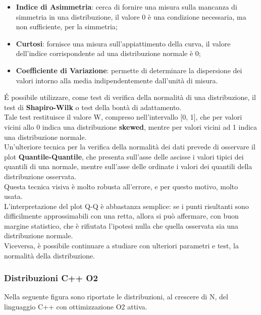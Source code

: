 \begin{itemize}
  \item \textbf{Indice di Asimmetria}: cerca di fornire una misura sulla mancanza
  di simmetria in una distribuzione, il valore 0 è una condizione necessaria, ma
  non sufficiente, per la simmetria;
  \item \textbf{Curtosi}: fornisce una misura sull'appiattimento della curva,
  il valore dell'indice corrispondente ad una distribuzione normale è 0;
  \item \textbf{Coefficiente di Variazione}: permette di determinare la dispersione
  dei valori intorno alla media indipendentemente dall'unità di misura.
\end{itemize}

\'E possibile utilizzare, come test di verifica della normalità di una distribuzione,
il test di \textbf{Shapiro-Wilk} o test della bontà di adattamento.\\
Tale test restituisce il valore W, compreso nell’intervallo [0, 1], che per
valori vicini allo 0 indica una distribuzione \textbf{skewed}, mentre per valori
vicini ad 1 indica una distribuzione normale.\\
Un'ulteriore tecnica per la verifica della normalità dei dati prevede di
osservare il plot \textbf{Quantile-Quantile}, che presenta sull'asse delle ascisse
i valori tipici dei quantili di una normale, mentre sull'asse delle ordinate i
valori dei quantili della distribuzione osservata.\\
Questa tecnica visiva è molto robusta all'errore, e per questo motivo, molto usata.\\
L'interpretazione del plot Q-Q è abbastanza semplice: se i punti risultanti sono
difficilmente approssimabili con una retta, allora si può affermare, con buon
margine statistico, che è rifiutata l'ipotesi nulla che quella osservata sia una
distribuzione normale.\\
Viceversa, è possibile continuare a studiare con ulteriori parametri e test, la
normalità della distribuzione.\\

\clearpage

\subsubsection{Distribuzioni C++ O2}
Nella seguente figura sono riportate le distribuzioni, al crescere di N, del
linguaggio C++ con ottimizzazione O2 attiva.

